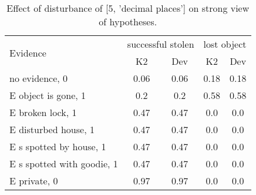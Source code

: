 \begin{table}\begin{tabular}{l|cc|cc}\toprule\multirow{2}{*}{Evidence} & \multicolumn{2}{c}{successful stolen}& \multicolumn{2}{c}{lost object}\\& {K2} & {Dev}& {K2} & {Dev}\\\midrule
no evidence, 0 & 0.06&0.06&0.18&0.18\\E object is gone, 1 & 0.2&0.2&0.58&0.58\\E broken lock, 1 & 0.47&0.47&0.0&0.0\\E disturbed house, 1 & 0.47&0.47&0.0&0.0\\E s spotted by house, 1 & 0.47&0.47&0.0&0.0\\E s spotted with goodie, 1 & 0.47&0.47&0.0&0.0\\E private, 0 & 0.97&0.97&0.0&0.0\\\bottomrule\end{tabular}\caption{Effect of disturbance of [5, 'decimal places'] on strong view of hypotheses.}\end{table}